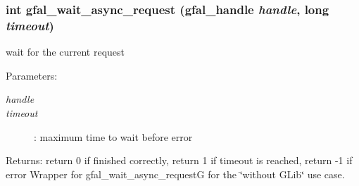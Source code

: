 \subsubsection{\setlength{\rightskip}{0pt plus 5cm}int gfal\_\-wait\_\-async\_\-request (gfal\_\-handle {\em handle}, long {\em timeout})}\label{gfal__common__interface_8h_08c8573e050334d5342a31a48b7db4cb}


wait for the current request 

\begin{Desc}
\item[Parameters:]
\begin{description}
\item[{\em handle}]\item[{\em timeout}]: maximum time to wait before error \end{description}
\end{Desc}
\begin{Desc}
\item[Returns:]return 0 if finished correctly, return 1 if timeout is reached, return -1 if error Wrapper for gfal\_\-wait\_\-async\_\-request\-G for the \char`\"{}without GLib\char`\"{} use case. \end{Desc}
